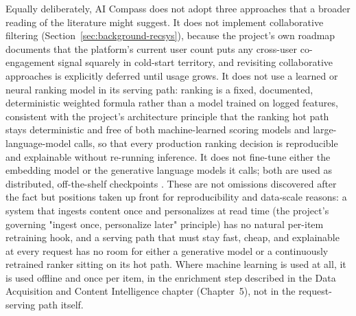 Equally deliberately, AI Compass does not adopt three approaches that a broader reading of the literature might suggest. It does not implement collaborative filtering (Section~\ref{sec:background-recsys}), because the project's own roadmap documents that the platform's current user count puts any cross-user co-engagement signal squarely in cold-start territory, and revisiting collaborative approaches is explicitly deferred until usage grows. It does not use a learned or neural ranking model in its serving path: ranking is a fixed, documented, deterministic weighted formula rather than a model trained on logged features, consistent with the project's architecture principle that the ranking hot path stays deterministic and free of both machine-learned scoring models and large-language-model calls, so that every production ranking decision is reproducible and explainable without re-running inference. It does not fine-tune either the embedding model or the generative language models it calls; both are used as distributed, off-the-shelf checkpoints \cite{sbert_docs,groq_docs}. These are not omissions discovered after the fact but positions taken up front for reproducibility and data-scale reasons: a system that ingests content once and personalizes at read time (the project's governing "ingest once, personalize later" principle) has no natural per-item retraining hook, and a serving path that must stay fast, cheap, and explainable at every request has no room for either a generative model or a continuously retrained ranker sitting on its hot path. Where machine learning is used at all, it is used offline and once per item, in the enrichment step described in the Data Acquisition and Content Intelligence chapter (Chapter~5), not in the request-serving path itself.
